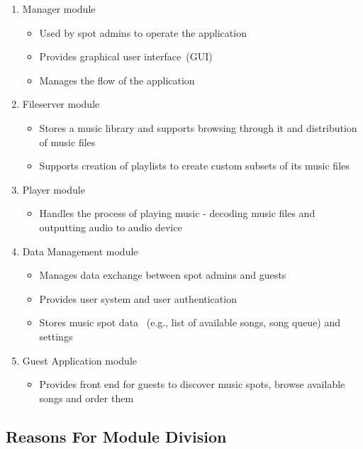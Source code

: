 \begin{enumerate}
    \item Manager module
        \begin{itemize}
            \item Used by spot admins to operate the application
            \item Provides graphical user interface~(GUI)
            \item Manages the flow of the application
        \end{itemize}
    \item Fileserver module
        \begin{itemize}
            \item Stores a music library and supports browsing through it and distribution of music files
            \item Supports creation of playlists to create custom subsets of its music files
        \end{itemize}
    \item Player module
        \begin{itemize}
            \item Handles the process of playing music - decoding music files and outputting audio to audio device
        \end{itemize}
    \item Data Management module
        \begin{itemize}
            \item Manages data exchange between spot admins and guests
            \item Provides user system and user authentication
            \item Stores music spot data ~(e.g., list of available songs, song queue) and settings
        \end{itemize}
    \item Guest Application module
        \begin{itemize}
            \item Provides front end for guests to discover music spots, browse available songs and order them
        \end{itemize}
\end{enumerate}

\subsection{Reasons For Module Division}

